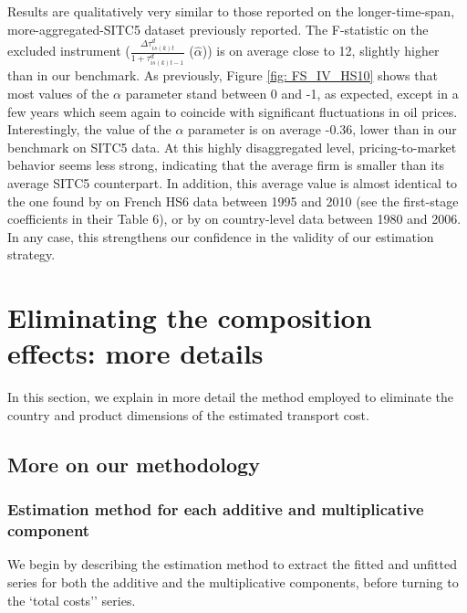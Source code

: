 \documentclass[a4paper,11pt]{article}
\begin{document}
Results are qualitatively very similar to those reported on the longer-time-span, more-aggregated-SITC5 dataset previously reported. The F-statistic on the excluded instrument ($\frac{\Delta \tau^d_{is(k)t}}{1+\tau_{is(k)t-1}^d}$ ($\widehat{\alpha}$)) is on average close to 12, slightly higher than in our benchmark. As previously, Figure \ref{fig: FS_IV_HS10} shows that most values of the $\alpha$ parameter stand between 0 and -1, as expected, except in a few years which seem again to coincide with significant fluctuations in oil prices. Interestingly, the value of the $\alpha$ parameter is on average -0.36, lower than in our benchmark on SITC5 data. At this highly disaggregated level, pricing-to-market behavior seems less strong, indicating that the average firm is smaller than its average SITC5 counterpart. In addition, this average value is almost identical to the one found by \citet{Fontagne_Martin_Orefice2018} on French HS6 data between 1995 and 2010 (see the first-stage coefficients in their Table 6), or by \citet{Bussiere2013} on country-level data between 1980 and 2006. In any case, this strengthens our confidence in the validity of our estimation strategy.

\clearpage
\setcounter{table}{0}
\setcounter{figure}{0}
\renewcommand{\thefigure}{C.\arabic{figure}}
\renewcommand{\thetable}{C.\arabic{table}}




\section{Eliminating the composition effects: more details \label{app:comp-effects}}

In this section, we explain in more detail the method employed to eliminate the country and product dimensions of the estimated transport cost.

\subsection{More on our methodology}


\subsubsection{Estimation method for each additive and multiplicative component}

We begin by describing the estimation method to extract the fitted and unfitted series for both the additive and the multiplicative components, before turning to the `total costs'' series.
\smallskip
\end{document}
